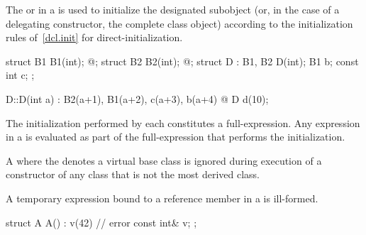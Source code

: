 \pnum
{}%
%
The
or 
in a
is used to initialize the
designated subobject (or, in the case of a delegating constructor, the complete class object)
according to the initialization rules of~\ref{dcl.init} for direct-initialization.
\begin{example}
\begin{codeblock}
struct B1 { B1(int); @\commentellip@ };
struct B2 { B2(int); @\commentellip@ };
struct D : B1, B2 {
  D(int);
  B1 b;
  const int c;
};

D::D(int a) : B2(a+1), B1(a+2), c(a+3), b(a+4) { @\commentellip@ }
D d(10);
\end{codeblock}
\end{example}
\begin{note}
The initialization
performed by each 
constitutes a full-expres\-sion.
Any expression in
a
is evaluated as part of the full-expression that performs the initialization.
\end{note}
A  where the  denotes
a virtual base class is ignored during execution of a constructor of any class that is
not the most derived class.

\pnum
A temporary expression bound to a reference member in a 
is ill-formed.
\begin{example}
\begin{codeblock}
struct A {
  A() : v(42) { }   // error
  const int& v;
};
\end{codeblock}
\end{example}

